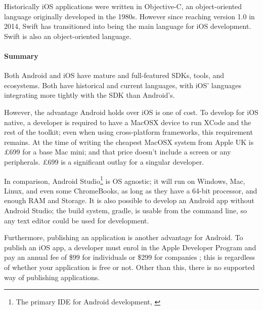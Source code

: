 \documentclass[11pt, a4paper, notitlepage]{report}
\begin{document}
Historically iOS applications were written in Objective-C, an object-oriented language originally developed in the 1980s. However since reaching version 1.0 in 2014, Swift \citep{Swift1.0} has transitioned into being the main language for iOS development. Swift is also an object-oriented language.

\paragraph{Summary} Both Android and iOS have mature and full-featured SDKs, tools, and ecosystems. Both have historical and current languages, with iOS' languages integrating more tightly with the SDK than Android's.

However, the advantage Android holds over iOS is one of cost. To develop for iOS native, a developer is required to have a MacOSX device to run XCode and the rest of the toolkit; even when using cross-platform frameworks, this requirement remains. At the time of writing the cheapest MacOSX system from Apple UK is £699 for a base Mac mini; and that price doesn't include a screen or any peripherals. £699 is a significant outlay for a singular developer.

In comparison, Android Studio\footnote{The primary IDE for Android development, \citep{androidstudio}} is OS agnostic; it will run on Windows, Mac, Linux, and even some ChromeBooks, as long as they have a 64-bit processor, and enough RAM and Storage. It is also possible to develop an Android app without Android Studio; the build system, gradle, is usable from the command line, so any text editor could be used for development.

Furthermore, publishing an application is another advantage for Android. To publish an iOS app, a developer must enrol in the Apple Developer Program and pay an annual fee of \$99 for individuals or \$299 for companies \citep{AppleDevProgram}; this is regardless of whether your application is free or not. Other than this, there is no supported way of publishing applications.
\end{document}
